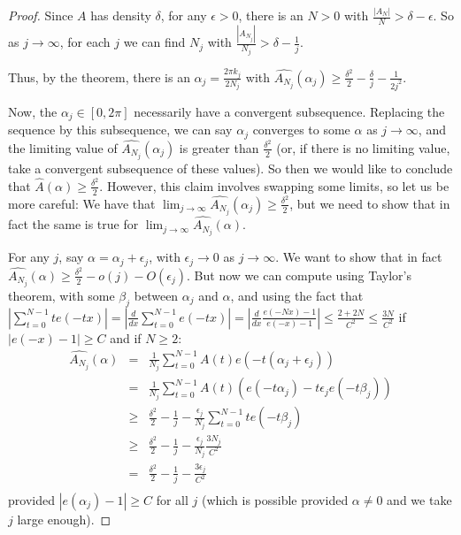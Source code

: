 \documentclass{report}
\theoremstyle{remark}
\numberwithin{equation}{section}
\begin{document}
\begin{proof}Since $A$ has density $\delta$, for any $\epsilon > 0$,
  there is an $N > 0$ with $\frac{|A_N|}{N} > \delta-\epsilon$.  So as
  $j \to \infty$, for each $j$ we can find $N_j$ with
  $\frac{|A_{N_j}|}{N_j} > \delta-\frac{1}{j}$.

  Thus, by the theorem, there is an $\alpha_j = \frac{2\pi k_j}{2N_j}$
  with
  $\widehat{A_{N_j}}(\alpha_j) \geq
  \frac{\delta^2}{2}-\frac{\delta}{j} - \frac{1}{2j^2}$.

  Now, the $\alpha_j \in [0,2\pi]$ necessarily have a convergent
  subsequence.  Replacing the sequence by this subsequence, we can say
  $\alpha_j$ converges to some $\alpha$ as $j \to \infty$, and the
  limiting value of $\widehat{A_{N_j}}(\alpha_j)$ is greater than
  $\frac{\delta^2}{2}$ (or, if there is no limiting value, take a
  convergent subsequence of these values).  So then we would like to
  conclude that $\widehat{A}(\alpha) \geq \frac{\delta^2}{2}$.
  However, this claim involves swapping some limits, so let us be more
  careful: We have that
  $\lim_{j \to \infty} \widehat{A_{N_j}}(\alpha_j) \geq
  \frac{\delta^2}{2}$, but we need to show that in fact the same is
  true for $\lim_{j \to \infty} \widehat{A_{N_j}}(\alpha)$.

  For any $j$, say $\alpha = \alpha_j + \epsilon_j$, with
  $\epsilon_j \to 0$ as $j \to \infty$.  We want to show that in fact
  $\widehat{A_{N_j}}(\alpha) \geq \frac{\delta^2}{2} - o(j) -
  O(\epsilon_j)$.  But now we can compute using Taylor's theorem, with
  some $\beta_j$ between $\alpha_j$ and $\alpha$, and using the fact
  that
  $\left|\sum_{t=0}^{N-1} t e(-tx)\right| =
  \left|\frac{d}{dx}\sum_{t=0}^{N-1} e(-tx)\right| =
  \left|\frac{d}{dx} \frac{e(-Nx) -1}{e(-x)-1}\right| \leq
  \frac{2+2N}{C^2} \leq \frac{3N}{C^2}$ if $|e(-x)-1| \geq C$ and if
  $N \geq 2$:
  \begin{eqnarray*}
    \widehat{A_{N_j}}(\alpha) &=& \frac{1}{N_j} \sum_{t=0}^{N-1} A(t)
                                  e(-t(\alpha_j+\epsilon_j))\\
                              &=& \frac{1}{N_j} \sum_{t=0}^{N-1} A(t)
                                  (e(-t\alpha_j)-t\epsilon_je(-t\beta_j))\\
                              &\geq& \frac{\delta^2}{2} - \frac{1}{j}
                                     - \frac{\epsilon_j}{N_j} \sum_{t=0}^{N-1}
                                     t e(-t\beta_j)\\
                              &\geq& \frac{\delta^2}{2} - \frac{1}{j}
                                     - \frac{\epsilon_j}{N_j} \frac{3N_j}{C^2}\\
                              &=& \frac{\delta^2}{2} - \frac{1}{j}
                                  - \frac{3\epsilon_j}{C^2}\\
  \end{eqnarray*}
  provided $|e(\alpha_j) - 1| \geq C$ for all $j$ (which is possible
  provided $\alpha \neq 0$ and we take $j$ large enough).


\end{proof}
\end{document}
